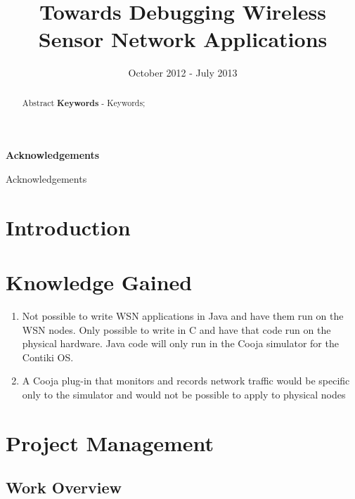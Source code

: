 \documentclass[a4paper]{article}
\title{Towards Debugging Wireless Sensor Network Applications}
\date{October 2012 - July 2013}
\author{}
\makeatletter
\newcommand\ackname{Acknowledgements}
\newenvironment{acknowledgements}{%
      \titlepage
      \null\vfil
      \@beginparpenalty\@lowpenalty
      \begin{center}%
        \bfseries \ackname
        \@endparpenalty\@M
      \end{center}}%
     {\par\vfil\null\endtitlepage}
\newenvironment{acknowledgements}{%
      \if@twocolumn
        \section*{\abstractname}%
      \else
        \small
        \begin{center}%
          {\bfseries \ackname\vspace{-.5em}\vspace{\z@}}%
        \end{center}%
        \quotation
      \fi}
      {\if@twocolumn\else\endquotation\fi}
\makeatother
\begin{document}
\maketitle

\pagestyle{empty}
\thispagestyle{empty}

\newpage

\begin{abstract}
Abstract
\newline
\newline
\noindent \textbf{Keywords} - Keywords;
\end{abstract}
\newpage

\begin{acknowledgements}
Acknowledgements
\end{acknowledgements}
\newpage


\pagestyle{plain}
\setcounter{page}{1}

\tableofcontents
\clearpage


\section{Introduction}

\clearpage


\section{Knowledge Gained}
\begin{enumerate}
	\item Not possible to write WSN applications in Java and have them run on the WSN nodes. Only possible to write in C and have that code run on the physical hardware. Java code will only run in the Cooja simulator for the Contiki OS.
	\item A Cooja plug-in that monitors and records network traffic would be specific only to the simulator and would not be possible to apply to physical nodes
\end{enumerate}
\clearpage


\section{Project Management}

\subsection{Work Overview}
\end{document}
